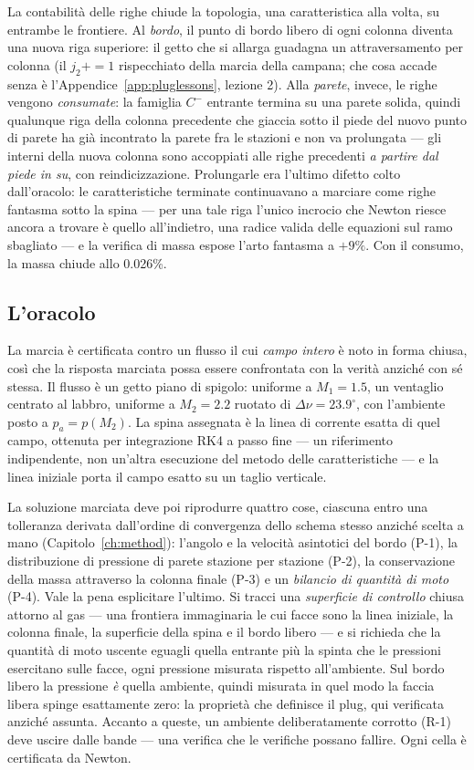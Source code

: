 La contabilità delle righe chiude la topologia, una caratteristica
alla volta, su entrambe le frontiere. Al \emph{bordo}, il punto di
bordo libero di ogni colonna diventa una nuova riga superiore: il
getto che si allarga guadagna un attraversamento per colonna (il
$j_2{+}{=}1$ rispecchiato della marcia della campana; che cosa
accade senza è l'Appendice~\ref{app:pluglessons}, lezione 2). Alla
\emph{parete}, invece, le righe vengono \emph{consumate}: la
famiglia $C^{-}$ entrante termina su una parete solida, quindi
qualunque riga della colonna precedente che giaccia sotto il piede
del nuovo punto di parete ha già incontrato la parete fra le
stazioni e non va prolungata --- gli interni della nuova colonna
sono accoppiati alle righe precedenti \emph{a partire dal piede in
su}, con reindicizzazione. Prolungarle era l'ultimo difetto colto
dall'oracolo: le caratteristiche terminate continuavano a marciare
come righe fantasma sotto la spina --- per una tale riga l'unico
incrocio che Newton riesce ancora a trovare è quello all'indietro,
una radice valida delle equazioni sul ramo sbagliato --- e la
verifica di massa espose l'arto fantasma a $+9\%$. Con il consumo,
la massa chiude allo 0.026\%.

\subsection{L'oracolo}

La marcia è certificata contro un flusso il cui \emph{campo intero}
è noto in forma chiusa, così che la risposta marciata possa essere
confrontata con la verità anziché con sé stessa. Il flusso è un
getto piano di spigolo: uniforme a $M_1 = 1.5$, un ventaglio
centrato al labbro, uniforme a $M_2 = 2.2$ ruotato di
$\Delta\nu = 23.9^{\circ}$, con l'ambiente posto a
$p_a = p(M_2)$. La spina assegnata è la linea di corrente esatta di
quel campo, ottenuta per integrazione RK4 a passo fine --- un
riferimento indipendente, non un'altra esecuzione del metodo delle
caratteristiche --- e la linea iniziale porta il campo esatto su un
taglio verticale.

La soluzione marciata deve poi riprodurre quattro cose, ciascuna
entro una tolleranza derivata dall'ordine di convergenza dello schema
stesso anziché scelta a mano (Capitolo~\ref{ch:method}): l'angolo e
la velocità asintotici del bordo (P-1), la distribuzione di
pressione di parete stazione per stazione (P-2), la conservazione
della massa attraverso la colonna finale (P-3) e un \emph{bilancio
di quantità di moto} (P-4). Vale la pena esplicitare l'ultimo. Si
tracci una \emph{superficie di controllo} chiusa attorno al gas ---
una frontiera immaginaria le cui facce sono la linea iniziale, la
colonna finale, la superficie della spina e il bordo libero --- e si
richieda che la quantità di moto uscente eguagli quella entrante più
la spinta che le pressioni esercitano sulle facce, ogni pressione
misurata rispetto all'ambiente. Sul bordo libero la pressione
\emph{è} quella ambiente, quindi misurata in quel modo la faccia
libera spinge esattamente zero: la proprietà che definisce il plug,
qui verificata anziché assunta. Accanto a queste, un ambiente
deliberatamente corrotto (R-1) deve uscire dalle bande --- una
verifica che le verifiche possano fallire. Ogni cella è certificata
da Newton.

